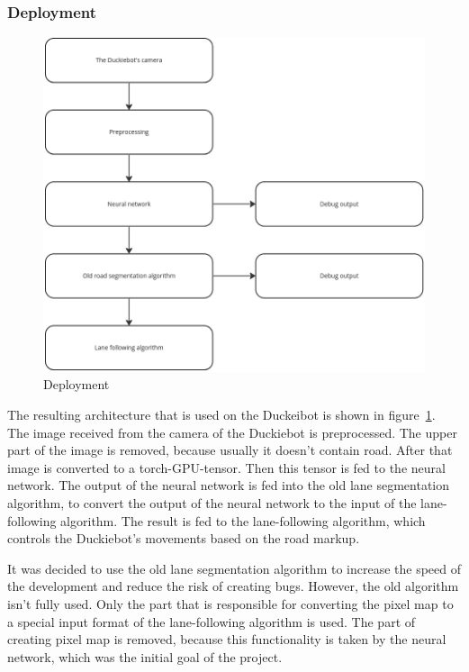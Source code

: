 \subsubsection{Deployment}
\begin{figure}[ht]
    \begin{center}
        \includegraphics[scale=0.25]{src/Design/assets/Deployment.png}
    \end{center}
    \caption{Deployment}\label{deployment}
\end{figure}
The resulting architecture that is used on the Duckeibot is shown in figure~\ref{deployment}. The image received from the camera of the Duckiebot is preprocessed.
The upper part of the image is removed, because usually it doesn't contain road. After that image is converted to a torch-GPU-tensor. Then this tensor is fed to the neural network.
The output of the neural network is fed into the old lane segmentation algorithm, to convert the output of the neural network to the input of the lane-following algorithm.
The result is fed to the lane-following algorithm, which controls the Duckiebot's movements based on the road markup.

It was decided to use the old lane segmentation algorithm to increase the speed of the development and reduce the risk of creating bugs. However, the old algorithm isn't
fully used. Only the part that is responsible for converting the pixel map to a special input format of the lane-following algorithm is used. The part of creating pixel 
map is removed, because this functionality is taken by the neural network, which was the initial goal of the project.

